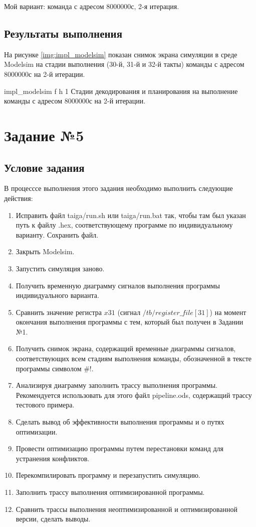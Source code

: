 Мой вариант: команда  с адресом 8000000с, 2-я итерация.

\subsection*{Результаты выполнения}

На рисунке \ref{img:impl_modelsim}  показан снимок экрана симуляции в среде Modelsim на стадии выполнения (30-й, 31-й и 32-й такты) команды с адресом 8000000с на 2-й итерации.

{impl_modelsim} %
{f} %
{h} %
{1\textwidth} %
{Стадии декодирования и планирования на выполнение команды с адресом 8000000с на 2-й итерации.} %

\clearpage 

\section{Задание №5}

\subsection*{Условие задания}

В процесссе выполнения этого задания необходимо выполнить следующие действия:

\begin{enumerate}[label=\arabic*)]
\item Исправить файл taiga/run.sh или taiga/run.bat так, чтобы там был указан путь к файлу .hex, соответствующему программе по индивидуальному варианту. Сохранить файл.
\item Закрыть Modelsim.
\item Запустить симуляция заново.
\item Получить временную диаграмму сигналов выполнения программы индивидуального варианта.
\item Сравнить значение регистра $x31$ (сигнал $/tb/register\_file[31]$) на момент окончания выполнения программы с тем, который был получен в Задании №1.
\item Получить снимок экрана, содержащий временные диаграммы сигналов, соответствующих всем стадиям выполнения команды, обозначенной в тексте программы символом $\#!$.
\item Анализируя диаграмму заполнить трассу выполнения программы. Рекомендуется использовать для этого файл pipeline.ods, содержащий трассу тестового примера.
\item Сделать вывод об эффективности выполнения программы и о путях оптимизации.
\item Провести оптимизацию программы путем перестановки команд для устранения конфликтов.
\item Перекомпилировать программу и перезапустить симуляцию.
\item Заполнить трассу выполнения оптимизированной программы.
\item Сравнить трассы выполнения неоптимизированной и оптимизированной версии, сделать выводы.
\end{enumerate}

